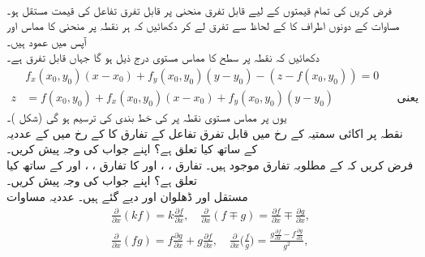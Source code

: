\\
فرض کریں  کی تمام قیمتوں کے لیے قابل تفرق منحنی  پر  قابل تفرق تفاعل  کی قیمت  مستقل  ہو۔ مساوات  کے دونوں اطراف کا  کے لحاظ سے تفرق لے کر دکھائیں کہ ہر نقطہ پر منحنی کا مماس اور   آپس میں عمود  ہیں۔ 
\\
دکھائیں کہ نقطہ  پر سطح   کا مماس مستوی  درج ذیل ہو گا جہاں  قابل تفرق ہے۔
\begin{align*}
&f_x(x_0,y_0)(x-x_0)+f_y(x_0,y_0)(y-y_0)-(z-f(x_0,y_0))=0\\
z&=f(x_0,y_0)+f_x(x_0,y_0)(x-x_0)+f_y(x_0,y_0)(y-y_0)&&\text{یعنی}
\end{align*} 
یوں  پر مماس مستوی  نقطہ  پر  کی خط بندی کی ترسیم ہو گی (شکل )۔
\\
نقطہ  پر اکائی سمتیہ   کے رخ  میں قابل تفرق تفاعل   کے تفارق  کا   کے رخ میں    کے عددیہ کے ساتھ کیا  تعلق ہے؟ اپنے جواب کی وجہ پیش کریں۔
\\
فرض کریں کہ  کے مطلوبہ تفارق موجود ہیں۔ تفارق ، ،  اور  کا تفارق ،  ، اور  کے ساتھ کیا تعلق ہے؟ اپنے جواب کی وجہ پیش کریں۔
\\
مستقل  اور ڈھلوان  اور    دیے گئے ہیں۔  عددیہ مساوات
\begin{align*}
\frac{\partial}{\partial x}(kf)=k\frac{\partial f}{\partial x},\quad \frac{\partial}{\partial x}(f\mp g)=\frac{\partial f}{\partial x}\mp \frac{\partial g}{\partial x},\\
\frac{\partial}{\partial x}(fg)=f\frac{\partial g}{\partial x}+g\frac{\partial f}{\partial x},\quad \frac{\partial}{\partial x}\big(\frac{f}{g}\big)=\frac{g\frac{\partial f}{\partial x}-f\frac{\partial g}{\partial x}}{g^2},
\end{align*}
